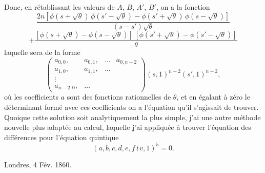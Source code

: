 \documentclass[11pt,a4paper]{book}
\begin{document}
Donc, en r\'{e}tablissant les valeurs de $A$, $B$, $A'$, $B'$, on a la fonction
\[
\frac{2n[\phi(s+\surd\theta)\,\phi(s'-\surd\theta) - \phi(s'+\surd\theta)\,\phi(s-\surd\theta)]}{(s-s')\surd\theta}
\]
\[
+ \frac{[\phi(s+\surd\theta) - \phi(s-\surd\theta)]\,[\phi(s'+\surd\theta) - \phi(s'-\surd\theta)]}{\theta}
\]
laquelle sera de la forme
\[
\left(\begin{array}{cccc}
a_{0,0}, & a_{0,1}, & \ldots & a_{0,n-2} \\
a_{1,0}, & a_{1,1}, & \ldots & \\
\vdots & & & \\
a_{n-2,0}, & \ldots & &
\end{array}\right)(s,1)^{n-2}(s',1)^{n-2},
\]
o\`{u} les coefficients $a$ sont des fonctions rationnelles de $\theta$, et en \'{e}galant \`{a} z\'{e}ro le d\'{e}terminant form\'{e} avec ces coefficients on a l'\'{e}quation qu'il s'agissait de trouver. Quoique cette solution soit analytiquement la plus simple, j'ai une autre m\'{e}thode nouvelle plus adapt\'{e}e au calcul, laquelle j'ai appliqu\'{e}e \`{a} trouver l'\'{e}quation des diff\'{e}rences pour l'\'{e}quation quintique
\[
(a,b,c,d,e,f\,\wr\,v,1)^5 = 0.
\]

\begin{flushright}
Londres, 4 F\'{e}v. 1860.
\end{flushright}


\end{document}
